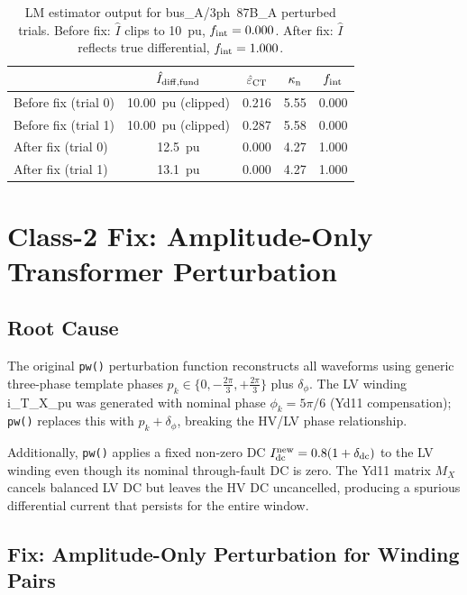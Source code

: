 \documentclass[12pt,a4paper]{article}
\newcommand{\kappan}{\kappa_{\rm n}}
\newcommand{\fint}{f_{\rm int}}
\begin{document}
\begin{table}[ht]
\centering
\caption{LM estimator output for bus\_A/3ph~87B\_A perturbed trials.
  Before fix: $\hat{I}$ clips to 10~pu, $\fint = 0.000$.
  After fix: $\hat{I}$ reflects true differential, $\fint = 1.000$.}
\label{tab:class1_verify}
\small
\begin{tabular}{lcccc}
\toprule
 & $\hat{I}_{\rm diff,fund}$ & $\hat{\varepsilon}_{\rm CT}$ &
   $\kappan$ & $\fint$ \\
\midrule
Before fix (trial 0) & 10.00~pu (clipped) & 0.216 & 5.55 & 0.000 \\
Before fix (trial 1) & 10.00~pu (clipped) & 0.287 & 5.58 & 0.000 \\
After fix (trial 0)  & 12.5~pu           & 0.000 & 4.27 & 1.000 \\
After fix (trial 1)  & 13.1~pu           & 0.000 & 4.27 & 1.000 \\
\bottomrule
\end{tabular}
\end{table}

\section{Class-2 Fix: Amplitude-Only Transformer Perturbation}
\label{sec:fix2}

\subsection{Root Cause}

The original \texttt{pw()} perturbation function reconstructs all
waveforms using generic three-phase template phases
$p_k \in \{0, -\tfrac{2\pi}{3}, +\tfrac{2\pi}{3}\}$ plus
$\delta_\phi$.  The LV winding i\_T\_X\_pu was generated with nominal
phase $\phi_k = 5\pi/6$ (Yd11 compensation); \texttt{pw()} replaces
this with $p_k + \delta_\phi$, breaking the HV/LV phase relationship.

Additionally, \texttt{pw()} applies a fixed non-zero DC
$I_{\rm dc}^{\rm new} = 0.8(1+\delta_{\rm dc})$ to the LV winding even
though its nominal through-fault DC is zero.  The Yd11 matrix $M_X$
cancels balanced LV DC but leaves the HV DC uncancelled, producing a
spurious differential current that persists for the entire window.

\subsection{Fix: Amplitude-Only Perturbation for Winding Pairs}
\end{document}
